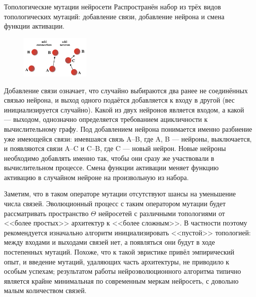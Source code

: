 \begin{exampleBox}[label=ex:wannmutations]{Топологические мутации нейросети}
Распространён набор из трёх видов топологических мутаций: добавление связи, добавление нейрона и смена функции активации. 

\begin{figure}
\centering
\vspace{-0.5cm}
\includegraphics[width=0.3\textwidth]{Images/topologymutation.png}
\vspace{-1cm}
\end{figure}

Добавление связи означает, что случайно выбираются два ранее не соединённых связью нейрона, и выход одного подаётся добавляется к входу в другой (вес инициализируется случайно). Какой из двух нейронов является входом, а какой --- выходом, однозначно определяется требованием ацикличности к вычислительному графу. Под добавлением нейрона понимается именно разбиение уже имеющейся связи: имевшаяся связь A--B, где A, B --- нейроны, выключается, и появляются связи A--C и C--B, где C --- новый нейрон. Новые нейроны необходимо добавлять именно так, чтобы они сразу же участвовали в вычислительном процессе. Смена функции активации меняет функцию активацию в случайном нейроне на произвольную из набора.

\begin{remark}
Заметим, что в таком операторе мутации отсутствуют шансы на уменьшение числа связей. Эволюционный процесс с таким оператором мутации будет рассматривать пространство $\Theta$ нейросетей с различными топологиями от <<более простых>> архитектур к <<более сложным>>. В частности поэтому рекомендуется изначально алгоритм инициализировать <<пустой>> топологией: между входами и выходами связей нет, а появляться они будут в ходе постепенных мутаций. Похоже, что к такой эвристике привёл эмпирический опыт, и введение мутаций, удаляющих часть архитектуры, не приводило к особым успехам; результатом работы нейроэволюционного алгоритма типично является крайне минимальная по современным меркам нейросеть, с довольно малым количеством связей.
\end{remark}
\end{exampleBox}

